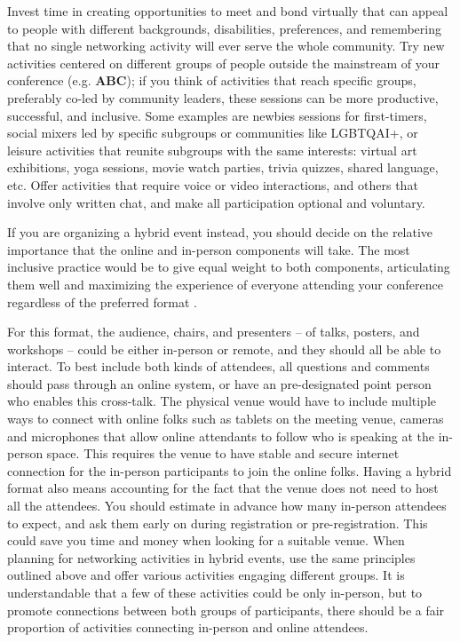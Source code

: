 \documentclass[10pt,letterpaper]{article}
\begin{document}
Invest time in creating opportunities to meet and bond virtually that can appeal to people with different backgrounds, disabilities, preferences, and remembering that no single networking activity will ever serve the whole community. 
Try new activities centered on different groups of people outside the mainstream of your conference (e.g. \textbf{ABC}); if you think of activities that reach specific groups, preferably co-led by community leaders, these sessions can be more productive, successful, and inclusive.
Some examples are newbies sessions for first-timers, social mixers led by specific subgroups or communities like LGBTQAI+, or leisure activities that reunite subgroups with the same interests: virtual art exhibitions, yoga sessions, movie watch parties, trivia quizzes, shared language, etc. 
Offer activities that require voice or video interactions, and others that involve only written chat, and make all participation optional and voluntary.

If you are organizing a hybrid event instead, you should decide on the relative importance that the online and in-person components will take. The most inclusive practice would be to give equal weight to both components, articulating them well and maximizing the experience of everyone attending your conference regardless of the preferred format \cite{bajpai_towards_2021}. 

 For this format, the audience, chairs, and presenters -- of talks, posters, and workshops -- could be either in-person or remote, and they should all be able to interact. 
To best include both kinds of attendees, all questions and comments should pass through an online system, or have an pre-designated point person who enables this cross-talk. 
The physical venue would have to include multiple ways to connect with online folks such as tablets on the meeting venue, cameras and microphones that allow online attendants to follow who is speaking at the in-person space.
This requires the venue to have stable and secure internet connection for the in-person participants to join the online folks. 
Having a hybrid format also means accounting for the fact that the venue does not need to host all the attendees. You should estimate in advance how many in-person attendees to expect, and ask them early on during registration or pre-registration. This could save you time and money when looking for a suitable venue.
When planning for networking activities in hybrid events, use the same principles outlined above and offer various activities engaging different groups. It is understandable that a few of these activities could be only in-person, but to promote connections between both groups of participants, there should be a fair proportion of activities connecting in-person and online attendees. 
\end{document}
